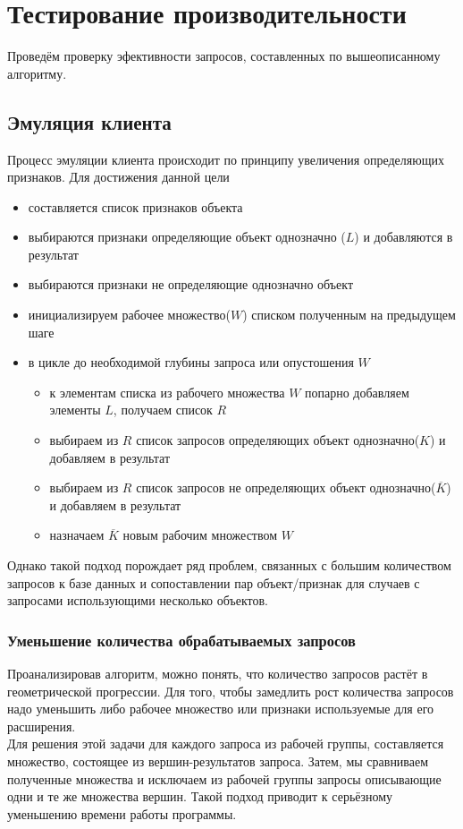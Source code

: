 \section{Тестирование производительности}
Проведём проверку эфективности запросов, составленных по вышеописанному алгоритму.
\subsection{Эмуляция клиента}
Процесс эмуляции клиента происходит по принципу увеличения определяющих признаков. 
Для достижения данной цели
\begin{itemize}
\item составляется список признаков объекта
\item выбираются признаки определяющие объект однозначно ($L$) и добавляются в результат
\item выбираются признаки не определяющие однозначно объект
\item инициализируем рабочее множество($W$) списком полученным на предыдущем шаге
\item в цикле до необходимой глубины запроса или опустошения $W$
\begin{itemize}
\item к элементам списка из рабочего множества $W$ попарно добавляем элементы $L$, получаем список $R$
\item выбираем из $R$ список запросов определяющих объект однозначно($K$) и добавляем в результат
\item выбираем из $R$ список запросов не определяющих объект однозначно($\overline{K}$) и добавляем в результат
\item назначаем $\overline{K}$ новым рабочим множеством $W$
\end{itemize}
\end{itemize}
Однако такой подход порождает ряд проблем, связанных с большим количеством запросов к базе данных и сопоставлении пар объект/признак для случаев с запросами использующими несколько объектов.
\subsubsection{Уменьшение количества обрабатываемых запросов}
Проанализировав алгоритм, можно понять, что количество запросов растёт в геометрической прогрессии. Для того, чтобы замедлить рост количества запросов надо уменьшить либо рабочее множество или признаки используемые для его расширения.\\
Для решения этой задачи для каждого запроса из рабочей группы, составляется множество, состоящее из вершин-результатов запроса. Затем, мы сравниваем полученные множества и исключаем из рабочей группы запросы описывающие одни и те же множества вершин. Такой подход приводит к серьёзному уменьшению времени работы программы.
